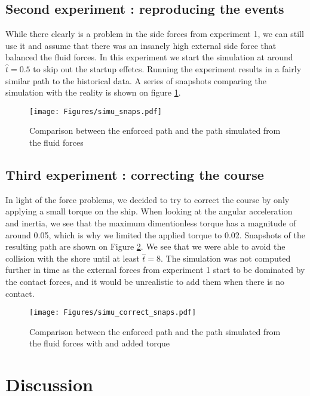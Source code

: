 \documentclass[a4paper]{article}
\begin{document}
\subsection{Second experiment : reproducing the events}
While there clearly is a problem in the side forces from experiment 1, we can still use it and assume that there was an insanely high external side force that balanced the fluid forces. In this experiment we start the simulation at around $\hat{t} = 0.5$ to skip out the startup effetcs. Running the experiment results in a fairly similar path to the historical data. A series of snapshots comparing the simulation with the reality is shown on figure \ref{fig:simu_snaps}.
\begin{figure}[hbtb]
    \centering
	\texttt{[image: Figures/simu\_snaps.pdf]}
	\caption{Comparison between the enforced path and the path simulated from the fluid forces}
	\label{fig:simu_snaps}
\end{figure}


\subsection{Third experiment : correcting the course}
In light of the force problems, we decided to try to correct the course by only applying a small torque on the ship. When looking at the angular acceleration and inertia, we see that the maximum dimentionless torque has a magnitude of around 0.05, which is why we limited the applied torque to 0.02. Snapshots of the resulting path are shown on Figure \ref{fig:simu_correct_snaps}. We see that we were able to avoid the collision with the shore until at least $\hat{t} = 8$. The simulation was not computed further in time as the external forces from experiment 1 start to be dominated by the contact forces, and it would be unrealistic to add them when there is no contact.

\begin{figure}[hbtb]
    \centering
	\texttt{[image: Figures/simu\_correct\_snaps.pdf]}
	\caption{Comparison between the enforced path and the path simulated from the fluid forces with and added torque}
	\label{fig:simu_correct_snaps}
\end{figure}


\section{Discussion}
\end{document}

